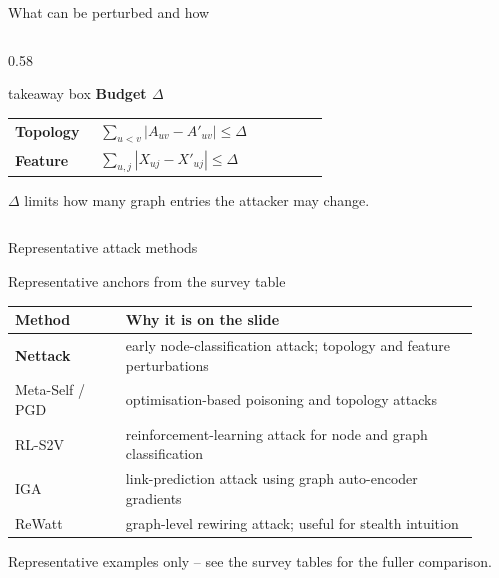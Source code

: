 \begin{frame}{What can be perturbed and how}
\begin{columns}[T,onlytextwidth]
\begin{column}{0.58\textwidth}
      \vspace{0.20em}
      \begin{beamercolorbox}[wd=\linewidth,rounded=true,sep=0.48em]{takeaway box}
        {\color{PresThreeAttack}\bfseries Budget \(\Delta\)}\par
        \vspace{0.2em}
        \begin{tabular}{@{}p{0.25\linewidth}p{0.67\linewidth}@{}}
          {\scriptsize\bfseries Topology} &
          \(\displaystyle \sum_{u<v}|A_{uv}-A'_{uv}|\le\Delta\) \\
          {\scriptsize\bfseries Feature} &
          \(\displaystyle \sum_{u,j}|X_{uj}-X'_{uj}|\le\Delta\)
        \end{tabular}
        \vspace{0.2em}
        {\scriptsize\color{PresThreeMuted}\(\Delta\) limits how many graph entries the attacker may change.}
      \end{beamercolorbox}
    \end{column}
  \end{columns}
\end{frame}

\begin{frame}{Representative attack methods}
  \begin{block}{Representative anchors from the survey table}
    \scriptsize
    \begin{tabular}{@{}p{0.22\linewidth}p{0.70\linewidth}@{}}
      \toprule
      Method & Why it is on the slide \\
      \midrule
      \textbf{Nettack} & early node-classification attack; topology and feature perturbations \\
      Meta-Self / PGD & optimisation-based poisoning and topology attacks \\
      RL-S2V & reinforcement-learning attack for node and graph classification \\
      IGA & link-prediction attack using graph auto-encoder gradients \\
      ReWatt & graph-level rewiring attack; useful for stealth intuition \\
      \bottomrule
    \end{tabular}
  \end{block}

  {\footnotesize\color{PresThreeMuted}Representative examples only -- see the survey tables for the fuller comparison.}
\end{frame}

